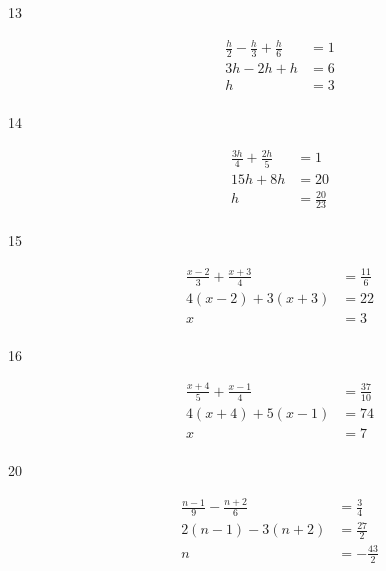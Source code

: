 \documentclass[letterpaper, landscape]{exam}
\begin{document}
\begin{description}
      \item[13] 
        \begin{align*}
          \frac{h}{2} - \frac{h}{3} + \frac{h}{6} & = 1 \\
          3h - 2h + h                             & = 6 \\
          h                                       & = \boxed{ 3 } \\
        \end{align*}

      \item[14] 
        \begin{align*}
          \frac{3h}{4} + \frac{2h}{5} & = 1 \\
          15h + 8h                    & = 20 \\
          h                           & = \boxed{ \frac{20}{23} } \\
        \end{align*}

      \item[15] 
        \begin{align*}
          \frac{x - 2}{3} + \frac{x + 3}{4} & = \frac{11}{6} \\
          4(x - 2) + 3(x + 3)               & = 22 \\
          x                                 & = \boxed{ 3 } \\
        \end{align*}

      \item[16] 
        \begin{align*}
          \frac{x + 4}{5} + \frac{x - 1}{4} & = \frac{37}{10} \\
          4 (x + 4) + 5 (x - 1)             & = 74 \\
          x                                 & = \boxed{ 7 } \\
        \end{align*}

      \item[20] 
        \begin{align*}
          \frac{n - 1}{9} - \frac{n + 2}{6} & = \frac{3}{4} \\
          2(n - 1) - 3(n + 2)               & = \frac{27}{2} \\
          n                                 & = \boxed{ - \frac{43}{2} } \\
        \end{align*}


\end{description}
\end{document}
